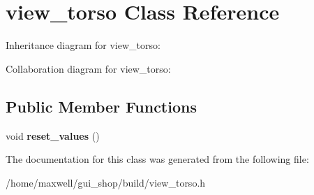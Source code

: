 \hypertarget{classview__torso}{}\section{view\+\_\+torso Class Reference}
\label{classview__torso}


Inheritance diagram for view\+\_\+torso\+:


Collaboration diagram for view\+\_\+torso\+:
\subsection*{Public Member Functions}
\begin{DoxyCompactItemize}
\item 
void {\bfseries reset\+\_\+values} ()\hypertarget{classview__torso_a2b0dd06fa3afa55c5e5be707fe2b542f}{}\label{classview__torso_a2b0dd06fa3afa55c5e5be707fe2b542f}

\end{DoxyCompactItemize}


The documentation for this class was generated from the following file\+:\begin{DoxyCompactItemize}
\item 
/home/maxwell/gui\+\_\+shop/build/view\+\_\+torso.\+h\end{DoxyCompactItemize}
